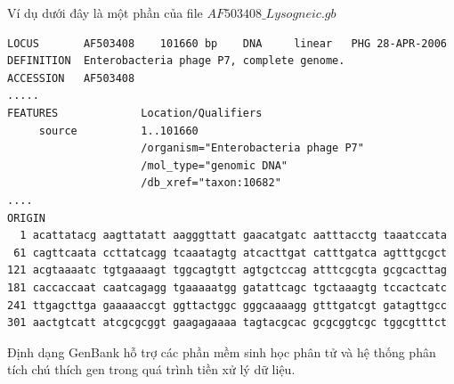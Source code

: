 Ví dụ dưới đây là một phần của file $AF503408\_Lysogneic.gb$
\begin{verbatim}
LOCUS       AF503408    101660 bp    DNA     linear   PHG 28-APR-2006
DEFINITION  Enterobacteria phage P7, complete genome.
ACCESSION   AF503408
.....
FEATURES             Location/Qualifiers
     source          1..101660
                     /organism="Enterobacteria phage P7"
                     /mol_type="genomic DNA"
                     /db_xref="taxon:10682"
....
ORIGIN      
  1 acattatacg aagttatatt aagggttatt gaacatgatc aatttacctg taaatccata
 61 cagttcaata ccttatcagg tcaaatagtg atcacttgat catttgatca agtttgcgct
121 acgtaaaatc tgtgaaaagt tggcagtgtt agtgctccag atttcgcgta gcgcacttag
181 caccaccaat caatcagagg tgaaaaatgg gatattcagc tgctaaagtg tccactcatc
241 ttgagcttga gaaaaaccgt ggttactggc gggcaaaagg gtttgatcgt gatagttgcc
301 aactgtcatt atcgcgcggt gaagagaaaa tagtacgcac gcgcggtcgc tggcgtttct
\end{verbatim}


Định dạng GenBank hỗ trợ các phần mềm sinh học phân tử và hệ thống phân tích chú thích gen trong quá trình tiền xử lý dữ liệu.

\cleardoublepage